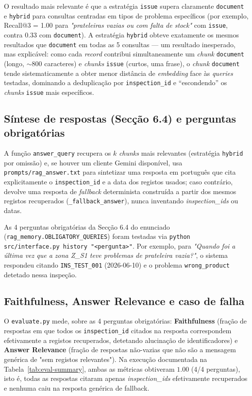 \documentclass[conference]{IEEEtran}
\begin{document}
O resultado mais relevante é que a estratégia \texttt{issue} supera
claramente \texttt{document} e \texttt{hybrid} para consultas centradas em
tipos de problema específicos (por exemplo, Recall@3 = 1.00 para
\textit{"prateleiras vazias ou com falta de stock"} com \texttt{issue},
contra 0.33 com \texttt{document}). A estratégia \texttt{hybrid} obteve
exatamente os mesmos resultados que \texttt{document} em todas as 5
consultas --- um resultado inesperado, mas explicável: como cada
\textit{record} contribui simultaneamente um \textit{chunk}
\texttt{document} (longo, $\sim$800 caracteres) e \textit{chunks}
\texttt{issue} (curtos, uma frase), o \textit{chunk} \texttt{document}
tende sistematicamente a obter menor distância de \textit{embedding} face
às \textit{queries} testadas, dominando a deduplicação por
\texttt{inspection\_id} e ``escondendo'' os \textit{chunks}
\texttt{issue} mais específicos.

\subsection{Síntese de respostas (Secção 6.4) e perguntas obrigatórias}

A função \texttt{answer\_query} recupera os $k$ \textit{chunks} mais
relevantes (estratégia \texttt{hybrid} por omissão) e, se houver um cliente
Gemini disponível, usa \texttt{prompts/rag\_answer.txt} para sintetizar uma
resposta em português que cita explicitamente o \texttt{inspection\_id} e a
data dos registos usados; caso contrário, devolve uma resposta de
\textit{fallback} determinista construída a partir dos mesmos registos
recuperados (\texttt{\_fallback\_answer}), nunca inventando
\textit{inspection\_ids} ou datas.

As 4 perguntas obrigatórias da Secção 6.4 do enunciado
(\texttt{rag\_memory.OBLIGATORY\_QUERIES}) foram testadas via
\texttt{python src/interface.py history "<pergunta>"}. Por exemplo, para
\textit{"Quando foi a última vez que a zona Z\_S1 teve problemas de
prateleira vazia?"}, o sistema respondeu citando \texttt{INS\_TEST\_001}
(2026-06-10) e o problema \texttt{wrong\_product} detetado nessa inspeção.

\subsection{Faithfulness, Answer Relevance e caso de falha}

O \texttt{evaluate.py} mede, sobre as 4 perguntas obrigatórias:
\textbf{Faithfulness} (fração de respostas em que todos os
\texttt{inspection\_id} citados na resposta correspondem efetivamente a
registos recuperados, detetando alucinação de identificadores) e
\textbf{Answer Relevance} (fração de respostas não-vazias que não são a
mensagem genérica de "sem registos relevantes"). Na execução documentada na
Tabela~\ref{tab:eval-summary}, ambas as métricas obtiveram $1.00$ (4/4
perguntas), isto é, todas as respostas citaram apenas \textit{inspection\_ids}
efetivamente recuperados e nenhuma caiu na resposta genérica de fallback.
\end{document}
